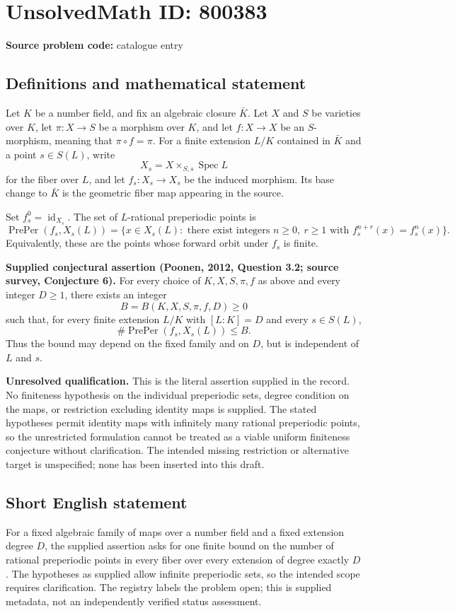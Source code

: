 \documentclass[11pt]{article}
\begin{document}
\section*{UnsolvedMath ID: 800383}
\textbf{Source problem code:} catalogue entry
\subsection{Definitions and mathematical statement}
Let \(K\) be a number field, and fix an algebraic closure \(\bar K\). Let \(X\) and \(S\) be varieties over \(K\), let \(\pi:X\to S\) be a morphism over \(K\), and let \(f:X\to X\) be an \(S\)-morphism, meaning that \(\pi\circ f=\pi\). For a finite extension \(L/K\) contained in \(\bar K\) and a point \(s\in S(L)\), write
\[
X_s=X\times_{S,s}\operatorname{Spec}L
\]
for the fiber over \(L\), and let \(f_s:X_s\to X_s\) be the induced morphism. Its base change to \(\bar K\) is the geometric fiber map appearing in the source.

Set \(f_s^0=\operatorname{id}_{X_s}\). The set of \(L\)-rational preperiodic points is
\[
\operatorname{PrePer}(f_s,X_s(L))
=\bigl\{x\in X_s(L):\text{ there exist integers }n\geq 0,\ r\geq 1
\text{ with }f_s^{n+r}(x)=f_s^n(x)\bigr\}.
\]
Equivalently, these are the points whose forward orbit under \(f_s\) is finite.

\textbf{Supplied conjectural assertion (Poonen, 2012, Question 3.2; source survey, Conjecture 6).} For every choice of \(K,X,S,\pi,f\) as above and every integer \(D\geq 1\), there exists an integer
\[
B=B(K,X,S,\pi,f,D)\geq 0
\]
such that, for every finite extension \(L/K\) with \([L:K]=D\) and every \(s\in S(L)\),
\[
\#\operatorname{PrePer}(f_s,X_s(L))\leq B.
\]
Thus the bound may depend on the fixed family and on \(D\), but is independent of \(L\) and \(s\).

\textbf{Unresolved qualification.} This is the literal assertion supplied in the record. No finiteness hypothesis on the individual preperiodic sets, degree condition on the maps, or restriction excluding identity maps is supplied. The stated hypotheses permit identity maps with infinitely many rational preperiodic points, so the unrestricted formulation cannot be treated as a viable uniform finiteness conjecture without clarification. The intended missing restriction or alternative target is unspecified; none has been inserted into this draft.
\subsection{Short English statement}
For a fixed algebraic family of maps over a number field and a fixed extension degree \(D\), the supplied assertion asks for one finite bound on the number of rational preperiodic points in every fiber over every extension of degree exactly \(D\). The hypotheses as supplied allow infinite preperiodic sets, so the intended scope requires clarification. The registry labels the problem open; this is supplied metadata, not an independently verified status assessment.
\end{document}
